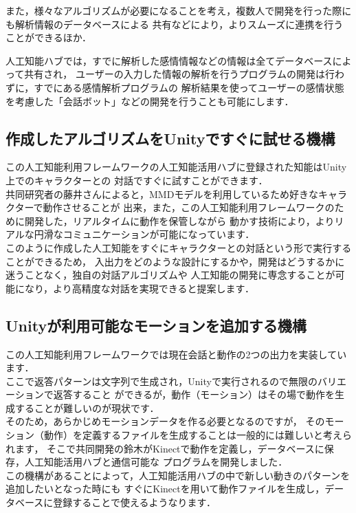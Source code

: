 また，様々なアルゴリズムが必要になることを考え，複数人で開発を行った際にも解析情報のデータベースによる
共有などにより，よりスムーズに連携を行うことができるほか．

人工知能ハブでは，すでに解析した感情情報などの情報は全てデータベースによって共有され，
ユーザーの入力した情報の解析を行うプログラムの開発は行わずに，すでにある感情解析プログラムの
解析結果を使ってユーザーの感情状態を考慮した「会話ボット」などの開発を行うことも可能にします．\\
\subsection{作成したアルゴリズムをUnityですぐに試せる機構}
この人工知能利用フレームワークの人工知能活用ハブに登録された知能はUnity上でのキャラクターとの
対話ですぐに試すことができます．\\

共同研究者の藤井さんによると，MMDモデルを利用しているため好きなキャラクターで動作させることが
出来，また，この人工知能利用フレームワークのために開発した，リアルタイムに動作を保管しながら
動かす技術により，よりリアルな円滑なコミュニケーションが可能になっています．\\

このように作成した人工知能をすぐにキャラクターとの対話という形で実行することができるため，
入出力をどのような設計にするかや，開発はどうするかに迷うことなく，独自の対話アルゴリズムや
人工知能の開発に専念することが可能になり，より高精度な対話を実現できると提案します．\\

\subsection{Unityが利用可能なモーションを追加する機構}
この人工知能利用フレームワークでは現在会話と動作の2つの出力を実装しています．\\

ここで返答パターンは文字列で生成され，Unityで実行されるので無限のバリエーションで返答すること
ができるが，動作（モーション）はその場で動作を生成することが難しいのが現状です．\\

そのため，あらかじめモーションデータを作る必要となるのですが，
そのモーション（動作）を定義するファイルを生成することは一般的には難しいと考えられます，
そこで共同開発の鈴木がKinectで動作を定義し，データベースに保存，人工知能活用ハブと通信可能な
プログラムを開発しました．\\

この機構があることによって，人工知能活用ハブの中で新しい動きのパターンを追加したいとなった時にも
すぐにKinectを用いて動作ファイルを生成し，データベースに登録することで使えるようなります．

